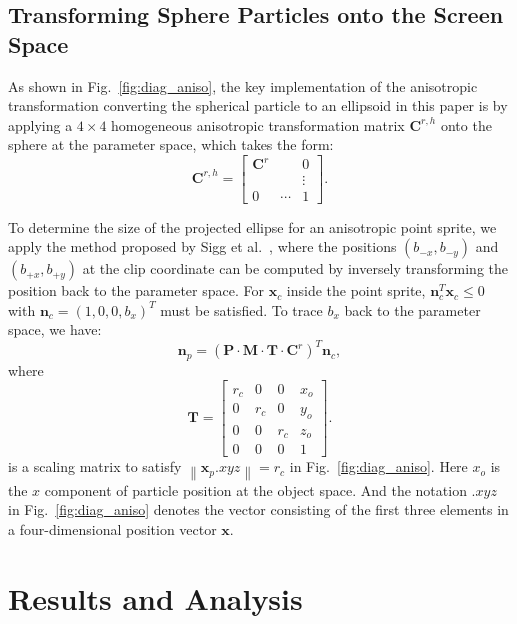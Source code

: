 \documentclass[times,twocolumn,final]{elsarticle}
\begin{document}
\subsection{Transforming Sphere Particles onto the Screen Space}
As shown in Fig.~\ref{fig:diag_aniso}, the key implementation of the anisotropic transformation converting the spherical particle to an ellipsoid in this paper is by applying a $4\times 4$ homogeneous anisotropic transformation matrix $\mathbf{C}^{r,h}$ onto the sphere at the parameter space, which takes the form:
\begin{equation}
    \mathbf{C}^{r,h} =
    \left[\begin{array}{ccc}
    \mathbf{C}^r & & 0 \\
    & & \vdots \\
    0 & \cdots & 1
    \end{array}\right].
\end{equation}

To determine the size of the projected ellipse for an anisotropic point sprite, we apply the method proposed by Sigg et al.~\cite{10.5555/2386388.2386396}, where the positions $(b_{-x},b_{-y})$ and $(b_{+x},b_{+y})$ at the clip coordinate can be computed by inversely transforming the position back to the parameter space. For $\mathbf{x}_c$ inside the point sprite, $\mathbf{n}_c^T\mathbf{x}_c\le 0$ with $\mathbf{n}_c=\left(1,0,0,b_x\right)^T$ must be satisfied. To trace $b_x$ back to the parameter space, we have:
\begin{equation}
    \mathbf{n}_p = \left( \mathbf{P}\cdot \mathbf{M}\cdot \mathbf{T}\cdot\mathbf{C}^r \right)^{T} \mathbf{n}_c,
\end{equation}
where
\begin{equation}
    \mathbf{T}=
    \left[\begin{array}{cccc}
    r_c & 0 & 0 & x_o \\
    0 & r_c & 0 & y_o \\
    0 & 0 & r_c & z_o \\
    0 & 0 & 0 & 1
    \end{array}\right].
\end{equation}
is a scaling matrix to satisfy $\left\| \mathbf{x}_p.{xyz} \right\| = r_c$ in Fig.~\ref{fig:diag_aniso}. Here $x_o$ is the $x$ component of particle position at the object space. And the notation $.xyz$ in Fig.~\ref{fig:diag_aniso} denotes the vector consisting of the first three elements in a four-dimensional position vector $\mathbf{x}$.

\section{Results and Analysis}
\end{document}
